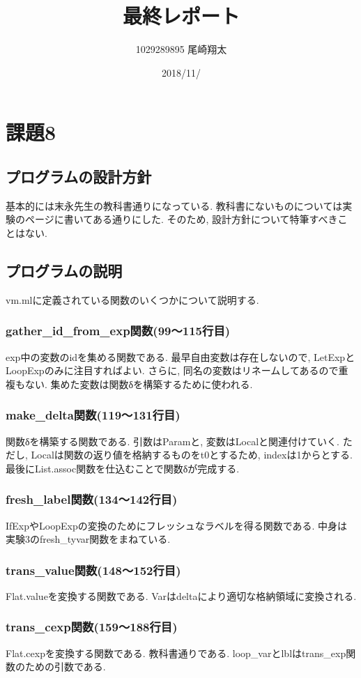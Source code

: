 \documentclass{jarticle}
\begin{document}
\title{最終レポート}
\author{1029289895 尾崎翔太}
\date{2018/11/}

\maketitle
\newpage

\section{課題8}
\subsection{プログラムの設計方針}
基本的には末永先生の教科書通りになっている. 教科書にないものについては実験のページに書いてある通りにした. そのため, 設計方針について特筆すべきことはない.
\subsection{プログラムの説明}
vm.mlに定義されている関数のいくつかについて説明する.
\subsubsection{gather\_id\_from\_exp関数(99～115行目)}
exp中の変数のidを集める関数である. 最早自由変数は存在しないので, LetExpとLoopExpのみに注目すればよい. さらに, 同名の変数はリネームしてあるので重複もない. 集めた変数は関数δを構築するために使われる.
\subsubsection{make\_delta関数(119～131行目)}
関数δを構築する関数である. 引数はParamと, 変数はLocalと関連付けていく. ただし, Localは関数の返り値を格納するものをt0とするため, indexは1からとする. 最後にList.assoc関数を仕込むことで関数δが完成する.
\subsubsection{fresh\_label関数(134～142行目)}
IfExpやLoopExpの変換のためにフレッシュなラベルを得る関数である. 中身は実験3のfresh\_tyvar関数をまねている.
\subsubsection{trans\_value関数(148～152行目)}
Flat.valueを変換する関数である. Varはdeltaにより適切な格納領域に変換される.
\subsubsection{trans\_cexp関数(159～188行目)}
Flat.cexpを変換する関数である. 教科書通りである. loop\_varとlblはtrans\_exp関数のための引数である. 
\end{document}
